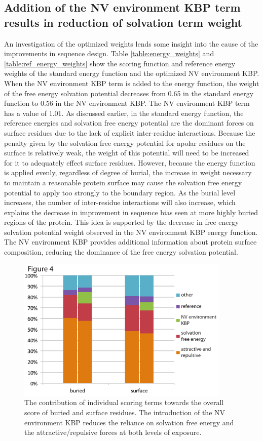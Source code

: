 \subsection{Addition of the \acs{NV} environment \acs{KBP} term results in reduction of solvation term weight}
An investigation of the optimized weights lends some insight into the cause of the improvements in sequence design.
 Table \ref{table:energy_weights} and \ref{table:ref_energy_weights} show the scoring function and reference energy weights of the standard energy function and the optimized \ac{NV} environment \ac{KBP}.
When the \ac{NV} environment \ac{KBP} term is added to the energy function, the weight of the free energy solvation potential decreases from 0.65 in the standard energy function to 0.56 in the \ac{NV} environment \ac{KBP}. 
The \ac{NV} environment \ac{KBP} term has a value of 1.01.
As discussed earlier, in the standard energy function, the reference energies and solvation free energy potential are the dominant forces on surface residues due to the lack of explicit inter-residue interactions.
Because the penalty given by the solvation free energy potential for apolar residues on the surface is relatively weak, the weight of this potential will need to be increased for it to adequately effect surface residues.
However, because the energy function is applied evenly, regardless of degree of burial, the increase in weight necessary to maintain a reasonable protein surface may cause the solvation free energy potential to apply too strongly to the boundary region.
As the burial level increases, the number of inter-residue interactions will also increase, which explains the decrease in improvement in sequence bias seen at more highly buried regions of the protein.
This idea is supported by the decrease in free energy solvation potential weight observed in the \ac{NV} environment \ac{KBP} energy function.
The \ac{NV} environment \ac{KBP} provides additional information about protein surface composition, reducing the dominance of the free energy solvation potential.

\begin{figure}
\centering
\includegraphics[width=4in]{figures/nv_kbp/term_contribution}
\caption{
The contribution of individual scoring terms towards the overall score of buried and surface residues.
The introduction of the \acs{NV} environment \acs{KBP} reduces the reliance on solvation free energy and the attractive/repulsive forces at both levels of exposure. 
}
\label{fig:term_contribution}
\end{figure}

